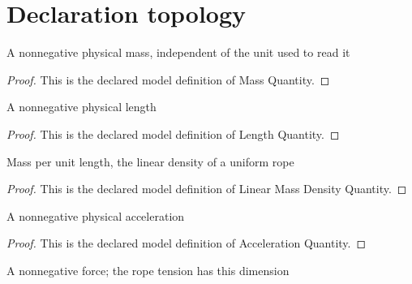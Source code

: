 \section{Declaration topology}
\begin{definition}
  \label{def:physics:phyx-mini-0188:phyxminiproblems-problemphyxmini0188-massquantity}
  A nonnegative physical mass, independent of the unit used to read it
\end{definition}
\begin{proof}
  This is the declared model definition of Mass Quantity.
\end{proof}
\begin{definition}
  \label{def:physics:phyx-mini-0188:phyxminiproblems-problemphyxmini0188-lengthquantity}
  A nonnegative physical length
\end{definition}
\begin{proof}
  This is the declared model definition of Length Quantity.
\end{proof}
\begin{definition}
  \label{def:physics:phyx-mini-0188:phyxminiproblems-problemphyxmini0188-linearmassdensityquantity}
  Mass per unit length, the linear density of a uniform rope
\end{definition}
\begin{proof}
  This is the declared model definition of Linear Mass Density Quantity.
\end{proof}
\begin{definition}
  \label{def:physics:phyx-mini-0188:phyxminiproblems-problemphyxmini0188-accelerationquantity}
  A nonnegative physical acceleration
\end{definition}
\begin{proof}
  This is the declared model definition of Acceleration Quantity.
\end{proof}
\begin{definition}
  \label{def:physics:phyx-mini-0188:phyxminiproblems-problemphyxmini0188-forcequantity}
  A nonnegative force; the rope tension has this dimension
\end{definition}
